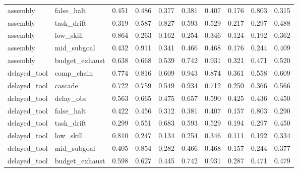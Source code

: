 \documentclass{article}
\begin{document}
\begin{longtable}{@{}llrrrrrrrr@{}}
assembly & false\_halt & 0.451 & 0.486 & 0.377 & 0.381 & 0.407 & 0.176 & 0.803 & 0.315 \\
assembly & task\_drift & 0.319 & 0.587 & 0.827 & 0.593 & 0.529 & 0.217 & 0.297 & 0.488 \\
assembly & low\_skill & 0.864 & 0.263 & 0.162 & 0.254 & 0.346 & 0.124 & 0.192 & 0.362 \\
assembly & mid\_subgoal & 0.432 & 0.911 & 0.341 & 0.466 & 0.468 & 0.176 & 0.244 & 0.409 \\
assembly & budget\_exhaust & 0.638 & 0.668 & 0.539 & 0.742 & 0.931 & 0.321 & 0.471 & 0.520 \\
delayed\_tool & comp\_chain & 0.774 & 0.816 & 0.609 & 0.943 & 0.874 & 0.361 & 0.558 & 0.609 \\
delayed\_tool & cascade & 0.722 & 0.759 & 0.549 & 0.934 & 0.712 & 0.250 & 0.366 & 0.566 \\
delayed\_tool & delay\_obs & 0.563 & 0.665 & 0.475 & 0.657 & 0.590 & 0.425 & 0.436 & 0.450 \\
delayed\_tool & false\_halt & 0.422 & 0.456 & 0.312 & 0.381 & 0.407 & 0.157 & 0.803 & 0.290 \\
delayed\_tool & task\_drift & 0.299 & 0.551 & 0.683 & 0.593 & 0.529 & 0.194 & 0.297 & 0.450 \\
delayed\_tool & low\_skill & 0.810 & 0.247 & 0.134 & 0.254 & 0.346 & 0.111 & 0.192 & 0.334 \\
delayed\_tool & mid\_subgoal & 0.405 & 0.854 & 0.282 & 0.466 & 0.468 & 0.157 & 0.244 & 0.377 \\
delayed\_tool & budget\_exhaust & 0.598 & 0.627 & 0.445 & 0.742 & 0.931 & 0.287 & 0.471 & 0.479 \\
\bottomrule
\end{longtable}
\end{document}
